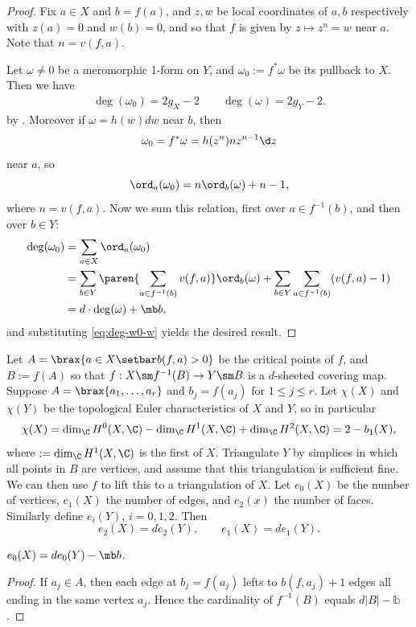 \documentclass[11pt]{report}
\begin{document}
\begin{proof}
Fix $a \in X$ and $b = f(a)$, and $z,w$ be local coordinates of $a,b$ respectively with $z(a)=0$ and $w(b)=0$, and so that $f$ is given by $z \mapsto z^n=w$ near $a$. Note that $n = v(f,a)$.

Let $\omega \neq 0$ be a meromorphic 1-form on $Y$, and $\omega_0 := f^*\omega$ be its pullback to $X$. Then we have
\begin{align} \label{eq:deg-w0-w}
    \deg (\omega_0) = 2g_X-2 \qquad \deg(\omega) = 2g_Y-2.
\end{align}
by . Moreover if $\omega = h(w)dw$ near $b$, then
\[
\omega_0 = f^*\omega = h(z^n)nz^{n-1}\d z
\]
near $a$, so \[
\ord_a(\omega_0)=n \ord_b(\omega)+n-1,
\]
where $n = v(f,a)$. Now we sum this relation, first over $a \in f^{-1}(b)$, and then over $b \in Y$:
\begin{align*}
    \deg (\omega _0) &= \sum_{a \in X}\ord_a(\omega_0) \\ &=\sum_{b \in Y}\paren{\sum_{a \in f^{-1}(b)}v(f,a)}\ord_b(\omega ) + \sum_{b \in Y}\sum_{a \in f^{-1}(b)}(v(f,a)-1) \\
    &= d \cdot \deg (\omega) + \mb b,
\end{align*}
and substituting \eqref{eq:deg-w0-w} yields the desired result.
\end{proof}

Let $A = \brax{a \in X \setbar b(f,a) > 0}$ be the critical points of $f$, and $B := f(A)$ so that $f:X \sm f^{-1}(B) \to Y \sm B$ is a $d$-sheeted covering map. Suppose $A = \brax{a_1,\dots,a_r}$ and $b_j = f(a_j)$ for $1 \leq j \leq r$. Let $\chi (X)$ and $\chi(Y)$ be the topological Euler characteristics of $X$ and $Y$, so in particular
\[
\chi(X) = \dim_\C H^0(X,\C) - \dim _\C H^1(X,\C) + \dim _\C H^2(X,\C)=2-b_1(X),
\]
where  $:= \dim _\C H^1(X,\C)$ is the first  of $X$. Triangulate $Y$ by simplices in which all points in $B$ are vertices, and assume that this triangulation is sufficient fine. We can then use $f$ to lift this to a triangulation of $X$. Let $e_0(X)$ be the number of vertices, $e_1(X)$ the number of edges, and $e_2(x)$ the number of faces. Similarly define $e_i(Y)$, $i=0,1,2$. Then
\[
e_2(X) = de_2(Y), \qquad e_1(X)=de_1(Y).
\]
\begin{claim}
$e_0(X)= de_0(Y)-\mb b$.
\end{claim}

\begin{proof}
If $a_j \in A$, then each edge at $b_j = f(a_j)$ lefts to $b(f,a_j)+1$ edges all ending in the same vertex $a_j$. Hence the cardinality of $f^{-1}(B)$ equals $d|B| - \mathbb{b}$.
\end{proof}
\end{document}
